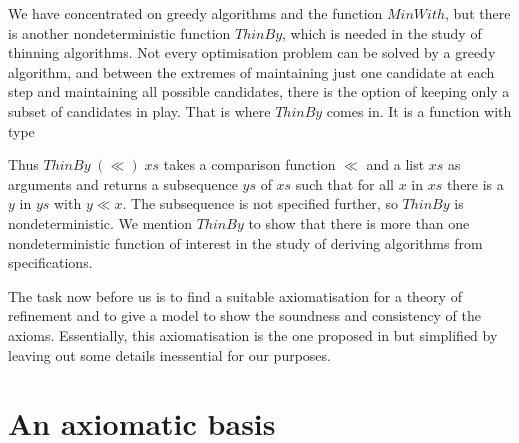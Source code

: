 \documentclass{llncs}
\newcommand{\Conid}[1]{\mathit{#1}}
\newcommand{\Varid}[1]{\mathit{#1}}
\def\resethooks{%
  \global\let\SaveRestoreHook\empty
  \global\let\ColumnHook\empty}
\let\hspre\empty
\let\hspost\empty
\begin{document}
We have concentrated on greedy algorithms and the function \ensuremath{\Conid{MinWith}}, but there is 
another nondeterministic function \ensuremath{\Conid{ThinBy}}, which is needed in the study of thinning 
algorithms. Not every optimisation problem can be solved by a greedy
algorithm, and between the extremes of maintaining just one candidate at each step and
maintaining all possible candidates, there is the option of keeping only a subset of
candidates in play. That is where \ensuremath{\Conid{ThinBy}} comes in. It is a function with type
\resethooks
Thus \ensuremath{\Conid{ThinBy}\;(\ll)\;\Varid{xs}} takes a comparison function \ensuremath{\ll} and a list \ensuremath{\Varid{xs}} as arguments
and returns a subsequence \ensuremath{\Varid{ys}} of \ensuremath{\Varid{xs}} such that for all \ensuremath{\Varid{x}} in \ensuremath{\Varid{xs}} there is a \ensuremath{\Varid{y}}
in \ensuremath{\Varid{ys}} with \ensuremath{\Varid{y}\ll\Varid{x}}. The subsequence is not specified further, so \ensuremath{\Conid{ThinBy}} is
nondeterministic. We mention \ensuremath{\Conid{ThinBy}} to show that there is more than one nondeterministic
function of interest in the study of deriving algorithms from specifications.

The task now before us is to find a suitable axiomatisation for a theory of
refinement and to give a model to show the soundness and consistency of the axioms. 
Essentially, this axiomatisation is the one proposed in \cite{m&b,m&b2} but simplified by
leaving out some details inessential for our purposes.

\section{An axiomatic basis}\label{sec:calc}
\end{document}
